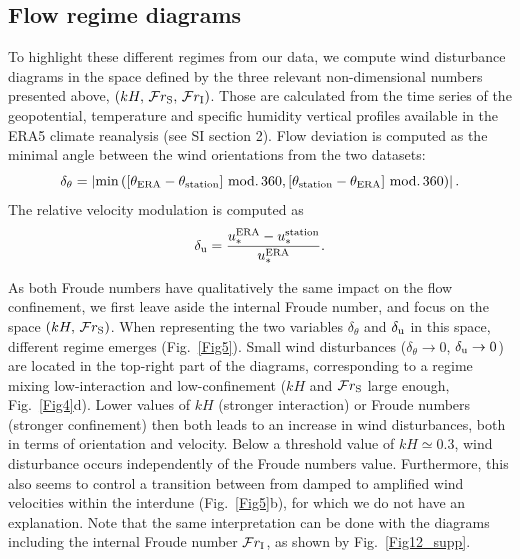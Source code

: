   \subsection{Flow regime diagrams}

  To highlight these different regimes from our data, we compute wind disturbance diagrams in the space defined by the three relevant non-dimensional numbers presented above, $\left(k H,\, \mathcal{F}r_{\textup{S}}, \, \mathcal{F}r_{\textup{I}}\right)$. Those are calculated from the time series of the geopotential, temperature and specific humidity vertical profiles available in the ERA5 climate reanalysis (see SI section 2).
  Flow deviation is computed as the minimal angle between the wind orientations from the two datasets:
  \begin{equation}
    \delta_{\theta} = \left\vert \textup{min}\left(\left[\theta_{\textup{ERA}} - \theta_{\textup{station}}\right] \, \textup{mod.} \, 360, \left[\theta_{\textup{station}} - \theta_{\textup{ERA}}\right] \, \textup{mod.} \, 360\right) \right\vert.
  \end{equation}
  The relative velocity modulation is computed as
  \begin{equation}
    \delta_{\textup{u}} = \frac{u_{*}^{\textup{ERA}} -  u_{*}^{\textup{station}}}{u_{*}^{\textup{ERA}}}.
  \end{equation}

  As both Froude numbers have qualitatively the same impact on the flow confinement, we first leave aside the internal Froude number, and focus on the space $(k H,\, \mathcal{F}r_{\textup{S}})$. When representing the two variables $\delta_{\theta}$ and $\delta_{\textup{u}}$ in this space, different regime emerges (Fig.~\ref{Fig5}). Small wind disturbances ($\delta_{\theta} \to 0$, $\delta_{\textup{u}} \to 0$) are located in the top-right part of the diagrams, corresponding to a regime mixing low-interaction and low-confinement ($k H$ and $\mathcal{F}r_{\textup{S}}$ large enough, Fig.~\ref{Fig4}d).
  Lower values of $k H$ (stronger interaction) or Froude numbers (stronger confinement) then both leads to an increase in wind disturbances, both in terms of orientation and velocity.   Below a threshold value of $k H \simeq 0.3$, wind disturbance occurs independently of the Froude numbers value. Furthermore, this also seems to control a transition between from damped to amplified wind velocities within the interdune (Fig.~\ref{Fig5}b), for which we do not have an explanation. Note that the same interpretation can be done with the diagrams including the internal Froude number $\mathcal{F}r_{\textup{I}}$, as shown by Fig.~\ref{Fig12_supp}.

